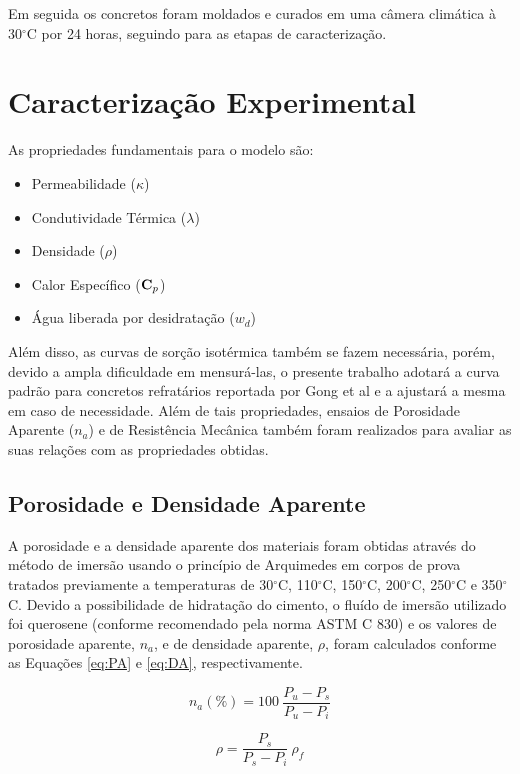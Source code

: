 Em seguida os concretos foram moldados e curados em uma câmera climática à
30$^{\circ}$C por 24 horas, seguindo para as etapas de caracterização.

\section{Caracterização Experimental}\label{mat:exp}
As propriedades fundamentais para o modelo são:

\begin{itemize}
\item Permeabilidade ($\kappa$)
\item Condutividade Térmica ($\lambda$)
\item Densidade ($\rho$)
\item Calor Específico ($\bm{\mathrm{C}}_p$)
\item Água liberada por desidratação ($w_d$)
\end{itemize}

Além disso, as curvas de sorção isotérmica também se fazem necessária, porém,
devido a ampla dificuldade em mensurá-las, o presente trabalho adotará a curva
padrão para concretos refratários reportada por Gong et al\cite{Gong1995a} e a
ajustará a mesma em caso de necessidade. Além de tais propriedades, ensaios de
Porosidade Aparente ($n_a$) e de Resistência Mecânica também foram realizados
para avaliar as suas relações com as propriedades obtidas.

\subsection{Porosidade e Densidade Aparente}\label{mat:porosidade}
A porosidade e a densidade aparente dos materiais foram obtidas através do
método de imersão usando o princípio de Arquimedes em corpos de prova tratados
previamente a temperaturas de 30$^\circ$C, 110$^\circ$C, 150$^\circ$C,
200$^\circ$C, 250$^\circ$C e 350$^\circ$C. Devido a possibilidade de hidratação
do cimento, o fluído de imersão utilizado foi querosene (conforme recomendado
pela norma ASTM C 830) e os valores de porosidade aparente, $n_a$, e de densidade
aparente, $\rho$, foram calculados conforme as Equações \ref{eq:PA} e
\ref{eq:DA}, respectivamente.

\begin{equation}
  \label{eq:PA}
  n_a (\%)= 100 \ \frac{P_u-P_s}{P_u-P_i}
\end{equation}

\begin{equation}
  \label{eq:DA}
  \rho = \frac{P_s}{P_s - P_i} \ \rho_f
\end{equation}

